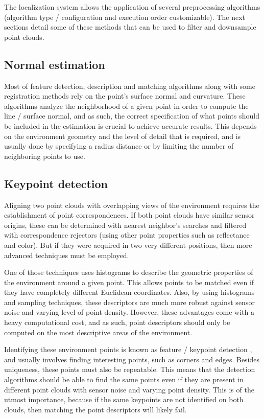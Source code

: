 The localization system allows the application of several preprocessing algorithms (algorithm type / configuration and execution order customizable). The next sections detail some of these methods that can be used to filter and downsample point clouds.


\subsection{Normal estimation}

Most of feature detection, description and matching algorithms along with some registration methods rely on the point's surface normal and curvature. These algorithms analyze the neighborhood of a given point in order to compute the line / surface normal, and as such, the correct specification of what points should be included in the estimation is crucial to achieve accurate results. This depends on the environment geometry and the level of detail that is required, and is usually done by specifying a radius distance or by limiting the number of neighboring points to use.


\subsection{Keypoint detection}

Aligning two point clouds with overlapping views of the environment requires the establishment of point correspondences. If both point clouds have similar sensor origins, these can be determined with nearest neighbor's searches and filtered with correspondence rejectors (using other point properties such as reflectance and color). But if they were acquired in two very different positions, then more advanced techniques must be employed.

One of those techniques uses histograms to describe the geometric properties of the environment around a given point. This allows points to be matched even if they have completely different Euclidean coordinates. Also, by using histograms and sampling techniques, these descriptors are much more robust against sensor noise and varying level of point density. However, these advantages come with a heavy computational cost, and as such, point descriptors should only be computed on the most descriptive areas of the environment.

Identifying these environment points is known as feature / keypoint detection \cite{Filipe2014}, and usually involves finding interesting points, such as corners and edges. Besides uniqueness, these points must also be repeatable. This means that the detection algorithms should be able to find the same points even if they are present in different point clouds with sensor noise and varying point density. This is of the utmost importance, because if the same keypoints are not identified on both clouds, then matching the point descriptors will likely fail.

